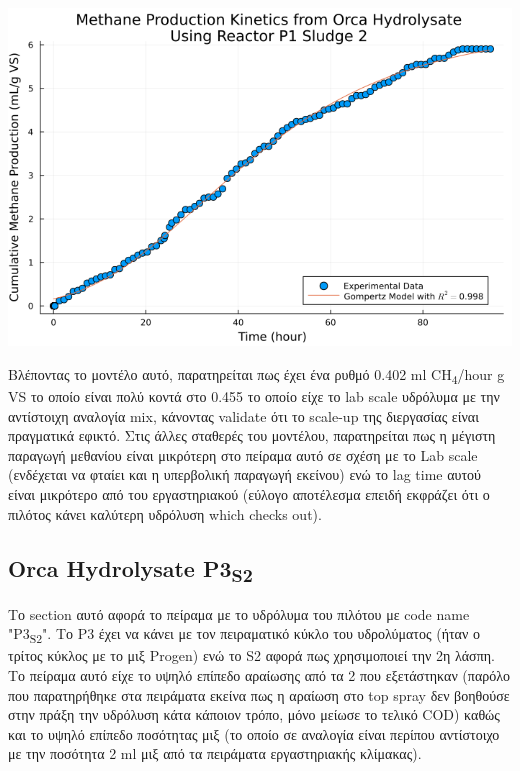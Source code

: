 \documentclass[11pt]{article}
\begin{document}
\begin{center}
\includegraphics[width=.9\linewidth]{../plots/BMPs/Orca Hydrolysate/specific_methane_kinetics_orca_p1_s2_hour.png}
\end{center}

Βλέποντας το μοντέλο αυτό, παρατηρείται πως έχει ένα ρυθμό 0.402 ml CH\textsubscript{4}/hour g VS το οποίο είναι πολύ κοντά στο 0.455 το οποίο είχε το lab scale υδρόλυμα με την αντίστοιχη αναλογία mix, κάνοντας validate ότι το scale-up της διεργασίας είναι πραγματικά εφικτό. Στις άλλες σταθερές του μοντέλου, παρατηρείται πως η μέγιστη παραγωγή μεθανίου είναι μικρότερη στο πείραμα αυτό σε σχέση με το Lab scale (ενδέχεται να φταίει και η υπερβολική παραγωγή εκείνου) ενώ το lag time αυτού είναι μικρότερο από του εργαστηριακού (εύλογο αποτέλεσμα επειδή εκφράζει ότι ο πιλότος κάνει καλύτερη υδρόλυση which checks out). 

\subsection{Orca Hydrolysate P3\textsubscript{S2}}
\label{sec:orge257469}
Το section αυτό αφορά το πείραμα με το υδρόλυμα του πιλότου με code name "P3\textsubscript{S2}". Το P3 έχει να κάνει με τον πειραματικό κύκλο του υδρολύματος (ήταν ο τρίτος κύκλος με το μιξ Progen) ενώ το S2 αφορά πως χρησιμοποιεί την 2η λάσπη. Το πείραμα αυτό είχε το υψηλό επίπεδο αραίωσης από τα 2 που εξετάστηκαν (παρόλο που παρατηρήθηκε στα πειράματα εκείνα πως η αραίωση στο top spray δεν βοηθούσε στην πράξη την υδρόλυση κάτα κάποιον τρόπο, μόνο μείωσε το τελικό COD) καθώς και το υψηλό επίπεδο ποσότητας μιξ (το οποίο σε αναλογία είναι περίπου αντίστοιχο με την ποσότητα 2 ml μιξ από τα πειράματα εργαστηριακής κλίμακας). 
\end{document}
